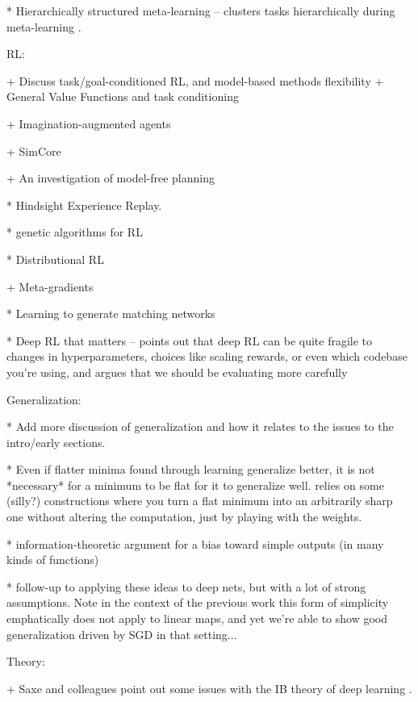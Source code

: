 * Hierarchically structured meta-learning -- clusters tasks hierarchically during meta-learning \citep{Yao2019}.




RL:

+ Discuss task/goal-conditioned RL, and model-based methods flexibility
    + General Value Functions and task conditioning \citep{Sutton2011}

+ Imagination-augmented agents \citep{Racaniere2017}

+ SimCore

+ An investigation of model-free planning \citep{Guez2019}

* Hindsight Experience Replay. \citep{Andrychowicz2017}

* genetic algorithms for RL \citep{Petroski2018}

* Distributional RL \citep{Bellemare2017}

+ Meta-gradients \citep{Xu2018a}

* Learning to generate matching networks \citep{Li2019a}

* Deep RL that matters -- points out that deep RL can be quite fragile to changes in hyperparameters, choices like scaling rewards, or even which codebase you're using, and argues that we should be evaluating more carefully \citep{Henderson2018}


Generalization:

* Add more discussion of generalization and how it relates to the issues to the intro/early sections.

* Even if flatter minima found through learning generalize better, it is not *necessary* for a minimum to be flat for it to generalize well. relies on some (silly?) constructions where you turn a flat minimum into an arbitrarily sharp one without altering the computation, just by playing with the weights. \citep{Dinh2017} 

* information-theoretic argument for a bias toward simple outputs (in many kinds of functions) \citep{Dingle2018}

* follow-up to \citep{Dingle2018} applying these ideas to deep nets, but with a lot of strong assumptions. \citep{Perez2019} Note in the context of the previous work this form of simplicity emphatically does not apply to linear maps, and yet we're able to show good generalization driven by SGD in that setting...  


Theory:

+ Saxe and colleagues point out some issues with the IB theory of deep learning \citep{Saxe2018a}.


